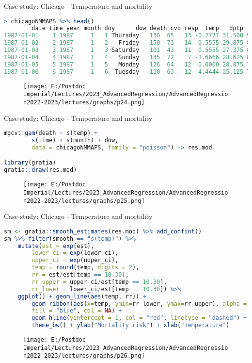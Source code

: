 \documentclass{beamer}
\begin{document}
\begin{frame}[fragile]{Case-study: Chicago - Temperature and mortality}
	\begin{lstlisting}[language=R, basicstyle=\tiny]
> chicagoNMMAPS %>% head()
        date time year month doy      dow death cvd resp  temp   dptp   rhum   pm10       
1987-01-01    1 1987     1   1 Thursday   130  65   13 -0.2777 31.500 95.500 26.956 
1987-01-02    2 1987     1   2   Friday   150  73   14  0.5555 29.875 88.250 NA 
1987-01-03    3 1987     1   3 Saturday   101  43   11  0.5555 27.375 89.500 32.838 
1987-01-04    4 1987     1   4   Sunday   135  72    7 -1.6666 28.625 84.500 39.956 
1987-01-05    5 1987     1   5   Monday   126  64   12  0.0000 28.875 74.500 NA 
1987-01-06    6 1987     1   6  Tuesday   130  63   12  4.4444 35.125 77.375 40.956 
	\end{lstlisting}
		\begin{figure}
		\texttt{[image: E:/Postdoc Imperial/Lectures/2023\_AdvancedRegression/AdvancedRegression2022-2023/lectures/graphs/p24.png]}
	\end{figure}
\end{frame}

\begin{frame}[fragile]{Case-study: Chicago - Temperature and mortality}
	\begin{lstlisting}[language=R, basicstyle=\tiny]
mgcv::gam(death ~ s(temp) + 
		s(time) + s(month) + dow, 
		data = chicagoNMMAPS, family = "poisson") -> res.mod

library(gratia)
gratia::draw(res.mod)
	\end{lstlisting}
	\begin{figure}
		\texttt{[image: E:/Postdoc Imperial/Lectures/2023\_AdvancedRegression/AdvancedRegression2022-2023/lectures/graphs/p25.png]}
	\end{figure}
\end{frame}


\begin{frame}[fragile]{Case-study: Chicago - Temperature and mortality}
	\begin{lstlisting}[language=R, basicstyle=\tiny]
sm <- gratia::smooth_estimates(res.mod) %>% add_confint()
sm %>% filter(smooth == "s(temp)") %>% 
	mutate(est = exp(est), 
		lower_ci = exp(lower_ci), 
		upper_ci = exp(upper_ci), 
		temp = round(temp, digits = 2),
		rr = est/est[temp == 10.30], 
		rr_upper = upper_ci/est[temp == 10.30], 
		rr_lower = lower_ci/est[temp == 10.30]) %>% 
	ggplot() + geom_line(aes(temp, rr)) + 
		geom_ribbon(aes(x=temp, ymin=rr_lower, ymax=rr_upper), alpha = 0.3, 
		fill = "blue", col = NA) + 
		geom_hline(yintercept = 1, col = "red", linetype = "dashed") + 
		theme_bw() + ylab("Mortality risk") + xlab("Temperature")
	\end{lstlisting}
	\begin{figure}
		\texttt{[image: E:/Postdoc Imperial/Lectures/2023\_AdvancedRegression/AdvancedRegression2022-2023/lectures/graphs/p26.png]}
	\end{figure}
\end{frame}
\end{document}
